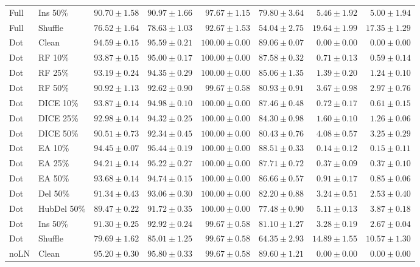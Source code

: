 {\begin{longtable}{llrrrrrr}
Full & Ins 50\% & $90.70\pm1.58$ & $90.97\pm1.66$ & $97.67\pm1.15$ & $79.80\pm3.64$ & $5.46\pm1.92$ & $5.00\pm1.94$ \\
Full & Shuffle & $76.52\pm1.64$ & $78.63\pm1.03$ & $92.67\pm1.53$ & $54.04\pm2.75$ & $19.64\pm1.99$ & $17.35\pm1.29$ \\
Dot & Clean & $94.59\pm0.15$ & $95.59\pm0.21$ & $100.00\pm0.00$ & $89.06\pm0.07$ & $0.00\pm0.00$ & $0.00\pm0.00$ \\
Dot & RF 10\% & $93.87\pm0.15$ & $95.00\pm0.17$ & $100.00\pm0.00$ & $87.58\pm0.32$ & $0.71\pm0.13$ & $0.59\pm0.14$ \\
Dot & RF 25\% & $93.19\pm0.24$ & $94.35\pm0.29$ & $100.00\pm0.00$ & $85.06\pm1.35$ & $1.39\pm0.20$ & $1.24\pm0.10$ \\
Dot & RF 50\% & $90.92\pm1.13$ & $92.62\pm0.90$ & $99.67\pm0.58$ & $80.93\pm0.91$ & $3.67\pm0.98$ & $2.97\pm0.76$ \\
Dot & DICE 10\% & $93.87\pm0.14$ & $94.98\pm0.10$ & $100.00\pm0.00$ & $87.46\pm0.48$ & $0.72\pm0.17$ & $0.61\pm0.15$ \\
Dot & DICE 25\% & $92.98\pm0.14$ & $94.32\pm0.25$ & $100.00\pm0.00$ & $84.30\pm0.98$ & $1.60\pm0.10$ & $1.26\pm0.06$ \\
Dot & DICE 50\% & $90.51\pm0.73$ & $92.34\pm0.45$ & $100.00\pm0.00$ & $80.43\pm0.76$ & $4.08\pm0.57$ & $3.25\pm0.29$ \\
Dot & EA 10\% & $94.45\pm0.07$ & $95.44\pm0.19$ & $100.00\pm0.00$ & $88.51\pm0.33$ & $0.14\pm0.12$ & $0.15\pm0.11$ \\
Dot & EA 25\% & $94.21\pm0.14$ & $95.22\pm0.27$ & $100.00\pm0.00$ & $87.71\pm0.72$ & $0.37\pm0.09$ & $0.37\pm0.10$ \\
Dot & EA 50\% & $93.68\pm0.14$ & $94.74\pm0.15$ & $100.00\pm0.00$ & $86.66\pm0.57$ & $0.91\pm0.17$ & $0.85\pm0.06$ \\
Dot & Del 50\% & $91.34\pm0.43$ & $93.06\pm0.30$ & $100.00\pm0.00$ & $82.20\pm0.88$ & $3.24\pm0.51$ & $2.53\pm0.40$ \\
Dot & HubDel 50\% & $89.47\pm0.22$ & $91.72\pm0.35$ & $100.00\pm0.00$ & $77.48\pm0.90$ & $5.11\pm0.13$ & $3.87\pm0.18$ \\
Dot & Ins 50\% & $91.30\pm0.25$ & $92.92\pm0.24$ & $99.67\pm0.58$ & $81.10\pm1.27$ & $3.28\pm0.19$ & $2.67\pm0.04$ \\
Dot & Shuffle & $79.69\pm1.62$ & $85.01\pm1.25$ & $99.67\pm0.58$ & $64.35\pm2.93$ & $14.89\pm1.55$ & $10.57\pm1.30$ \\
noLN & Clean & $95.20\pm0.30$ & $95.80\pm0.33$ & $99.67\pm0.58$ & $89.60\pm1.21$ & $0.00\pm0.00$ & $0.00\pm0.00$ \\

\end{longtable}}
